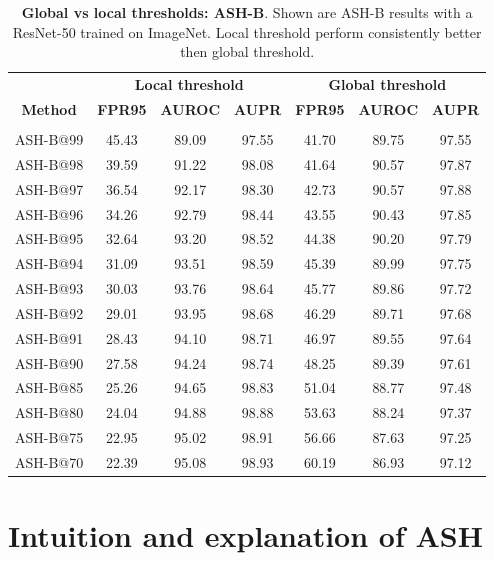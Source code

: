 \documentclass{article}
\newcommand{\seclabel}[1]{\label{sec:#1}}
\newcommand{\tablabel}[1]{\label{tab:#1}}
\begin{document}
\begin{table}[hbt!]
\centering
\begin{tabular}{c c c c | c c c}
        \hline
         & \multicolumn{3}{c}{\textbf{Local threshold}} & \multicolumn{3}{c}{\textbf{Global threshold}} \\
        \textbf{Method} & \textbf{FPR95} & \textbf{AUROC} & \textbf{AUPR} & \textbf{FPR95} & \textbf{AUROC} & \textbf{AUPR} \\
         &  &  & \multicolumn{1}{c}{} &  &  & \multicolumn{1}{c}{} \\
        \midrule
        ASH-B@99 & 45.43 & 89.09 & 97.55 & 41.70 & 89.75 & 97.55 \\
        ASH-B@98 & 39.59 & 91.22 & 98.08 & 41.64 & 90.57 & 97.87 \\
        ASH-B@97 & 36.54 & 92.17 & 98.30 & 42.73 & 90.57 & 97.88 \\
        ASH-B@96 & 34.26 & 92.79 & 98.44 & 43.55 & 90.43 & 97.85 \\
        ASH-B@95 & 32.64 & 93.20 & 98.52 & 44.38 & 90.20 & 97.79 \\
        ASH-B@94 & 31.09 & 93.51 & 98.59 & 45.39 & 89.99 & 97.75 \\
        ASH-B@93 & 30.03 & 93.76 & 98.64 & 45.77 & 89.86 & 97.72 \\
        ASH-B@92 & 29.01 & 93.95 & 98.68 & 46.29 & 89.71 & 97.68 \\
        ASH-B@91 & 28.43 & 94.10 & 98.71 & 46.97 & 89.55 & 97.64 \\
        ASH-B@90 & 27.58 & 94.24 & 98.74 & 48.25 & 89.39 & 97.61 \\
        ASH-B@85 & 25.26 & 94.65 & 98.83 & 51.04 & 88.77 & 97.48 \\
        ASH-B@80 & 24.04 & 94.88 & 98.88 & 53.63 & 88.24 & 97.37 \\
        ASH-B@75 & 22.95 & 95.02 & 98.91 & 56.66 & 87.63 & 97.25 \\
        ASH-B@70 & 22.39 & 95.08 & 98.93 & 60.19 & 86.93 & 97.12 \\
        \midrule
    \end{tabular}
\caption{\textbf{Global vs local thresholds: ASH-B}. Shown are ASH-B results with a ResNet-50 trained on ImageNet. Local threshold perform consistently better then global threshold.}
    \tablabel{appendix_global_vs_local}
\end{table}

\section{Intuition and explanation of ASH}
\seclabel{additional_disc}
\end{document}
